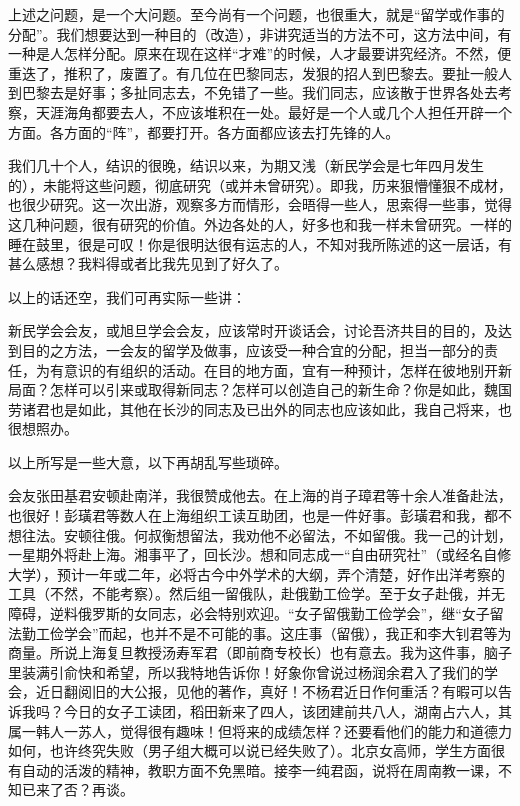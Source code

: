 上述之问题，是一个大问题。至今尚有一个问题，也很重大，就是“留学或作事的分配”。我们想要达到一种目的（改造），非讲究适当的方法不可，这方法中间，有一种是人怎样分配。原来在现在这样“才难”的时候，人才最要讲究经济。不然，便重迭了，推积了，废置了。有几位在巴黎同志，发狠的招人到巴黎去。要扯一般人到巴黎去是好事；多扯同志去，不免错了一些。我们同志，应该散于世界各处去考察，天涯海角都要去人，不应该堆积在一处。最好是一个人或几个人担任开辟一个方面。各方面的“阵”，都要打开。各方面都应该去打先锋的人。

我们几十个人，结识的很晚，结识以来，为期又浅（新民学会是七年四月发生的），未能将这些问题，彻底研究（或并未曾研究）。即我，历来狠懵懂狠不成材，也很少研究。这一次出游，观察多方而情形，会晤得一些人，思索得一些事，觉得这几种问题，很有研究的价值。外边各处的人，好多也和我一样未曾研究。一样的睡在鼓里，很是可叹！你是很明达很有运志的人，不知对我所陈述的这一层话，有甚么感想？我料得或者比我先见到了好久了。

以上的话还空，我们可再实际一些讲：

新民学会会友，或旭旦学会会友，应该常时开谈话会，讨论吾济共目的目的，及达到目的之方法，一会友的留学及做事，应该受一种合宜的分配，担当一部分的责任，为有意识的有组织的活动。在目的地方面，宜有一种预计，怎样在彼地别开新局面？怎样可以引来或取得新同志？怎样可以创造自己的新生命？你是如此，魏国劳诸君也是如此，其他在长沙的同志及已出外的同志也应该如此，我自己将来，也很想照办。

以上所写是一些大意，以下再胡乱写些琐碎。

会友张田基君安顿赴南洋，我很赞成他去。在上海的肖子璋君等十余人准备赴法，也很好！彭璜君等数人在上海组织工读互助团，也是一件好事。彭璜君和我，都不想往法。安顿往俄。何叔衡想留法，我劝他不必留法，不如留俄。我一己的计划，一星期外将赴上海。湘事平了，回长沙。想和同志成一“自由研究社”（或经名自修大学），预计一年或二年，必将古今中外学术的大纲，弄个清楚，好作出洋考察的工具（不然，不能考察）。然后组一留俄队，赴俄勤工俭学。至于女子赴俄，并无障碍，逆料俄罗斯的女同志，必会特别欢迎。“女子留俄勤工俭学会”，继“女子留法勤工俭学会”而起，也并不是不可能的事。这庄事（留俄），我正和李大钊君等为商量。所说上海复旦教授汤寿军君（即前商专校长）也有意去。我为这件事，脑子里装满引俞快和希望，所以我特地告诉你！好象你曾说过杨润余君入了我们的学会，近日翻阅旧的大公报，见他的著作，真好！不杨君近日作何重活？有暇可以告诉我吗？今日的女子工读团，稻田新来了四人，该团建前共八人，湖南占六人，其属一韩人一苏人，觉得很有趣味！但将来的成绩怎样？还要看他们的能力和道德力如何，也许终究失败（男子组大概可以说已经失败了）。北京女高师，学生方面很有自动的活泼的精神，教职方面不免黑暗。接李一纯君函，说将在周南教一课，不知已来了否？再谈。

